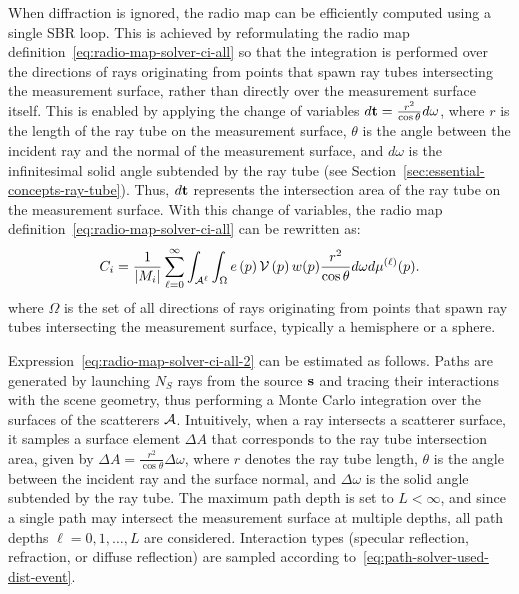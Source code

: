 When diffraction is ignored, the radio map can be efficiently computed using a single \gls{SBR} loop. This is achieved by reformulating the radio map definition~\eqref{eq:radio-map-solver-ci-all} so that the integration is performed over the directions of rays originating from points that spawn ray tubes intersecting the measurement surface, rather than directly over the measurement surface itself. This is enabled by applying the change of variables $d\mathbf{t} = \frac{r^2}{\cos \theta} d\omega$, where $r$ is the length of the ray tube on the measurement surface, $\theta$ is the angle between the incident ray and the normal of the measurement surface, and $d\omega$ is the infinitesimal solid angle subtended by the ray tube (see Section~\ref{sec:essential-concepts-ray-tube}). Thus, $d\mathbf{t}$ represents the intersection area of the ray tube on the measurement surface.
With this change of variables, the radio map definition~\eqref{eq:radio-map-solver-ci-all} can be rewritten as:
\begin{equation}
    \label{eq:radio-map-solver-ci-all-2}
    C_i = \frac{1}{\left| M_i \right|} \sum_{\ell=0}^{\infty} \int_{{\cal A}^{\ell}} \int_{\Omega} e \left( p \right) {\cal V}\left( p \right) w(p) \frac{r^2}{\cos \theta} d\omega d\mu^{(\ell)}(p).
\end{equation}
where $\Omega$ is the set of all directions of rays originating from points that spawn ray tubes intersecting the measurement surface, typically a hemisphere or a sphere.

Expression~\eqref{eq:radio-map-solver-ci-all-2} can be estimated as follows. Paths are generated by launching $N_S$ rays from the source $\mathbf{s}$ and tracing their interactions with the scene geometry, thus performing a Monte Carlo integration over the surfaces of the scatterers ${\cal A}$. Intuitively, when a ray intersects a scatterer surface, it samples a surface element $\Delta A$ that corresponds to the ray tube intersection area, given by $\Delta A = \frac{r^2}{\cos \theta} \Delta \omega$, where $r$ denotes the ray tube length, $\theta$ is the angle between the incident ray and the surface normal, and $\Delta \omega$ is the solid angle subtended by the ray tube. The maximum path depth is set to $L < \infty$, and since a single path may intersect the measurement surface at multiple depths, all path depths $\ell = 0, 1, \ldots, L$ are considered. Interaction types (specular reflection, refraction, or diffuse reflection) are sampled according to~\eqref{eq:path-solver-used-dist-event}.

